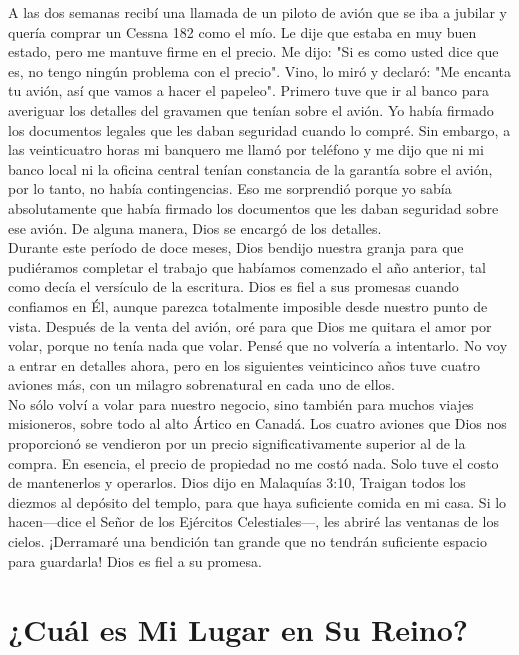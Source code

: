 \documentclass[twoside, 12pt]{book}
\begin{document}
A las dos semanas recibí una llamada de un piloto de avión que se iba a jubilar y quería comprar un Cessna 182 como el mío. Le dije que estaba en muy buen estado, pero me mantuve firme en el precio. Me dijo: "Si es como usted dice que es, no tengo ningún problema con el precio". Vino, lo miró y declaró: "Me encanta tu avión, así que vamos a hacer el papeleo". Primero tuve que ir al banco para averiguar los detalles del gravamen que tenían sobre el avión. Yo había firmado los documentos legales que les daban seguridad cuando lo compré. Sin embargo, a las veinticuatro horas mi banquero me llamó por teléfono y me dijo que ni mi banco local ni la oficina central tenían constancia de la garantía sobre el avión, por lo tanto, no había contingencias. Eso me sorprendió porque yo sabía absolutamente que había firmado los documentos que les daban seguridad sobre ese avión. De alguna manera, Dios se encargó de los detalles.\\

Durante este período de doce meses, Dios bendijo nuestra granja para que pudiéramos completar el trabajo que habíamos comenzado el año anterior, tal como decía el versículo de la escritura. Dios es fiel a sus promesas cuando confiamos en Él, aunque parezca totalmente imposible desde nuestro punto de vista. Después de la venta del avión, oré para que Dios me quitara el amor por volar, porque no tenía nada que volar. Pensé que no volvería a intentarlo. No voy a entrar en detalles ahora, pero en los siguientes veinticinco años tuve cuatro aviones más, con un milagro sobrenatural en cada uno de ellos.\\

No sólo volví a volar para nuestro negocio, sino también para muchos viajes misioneros, sobre todo al alto Ártico en Canadá. Los cuatro aviones que Dios nos proporcionó se vendieron por un precio significativamente superior al de la compra. En esencia, el precio de propiedad no me costó nada. Solo tuve el costo de mantenerlos y operarlos. Dios dijo en Malaquías 3:10, Traigan todos los diezmos al depósito del templo, para que haya suficiente comida en mi casa. Si lo hacen—dice el Señor de los Ejércitos Celestiales—, les abriré las ventanas de los cielos. ¡Derramaré una bendición tan grande que no tendrán suficiente espacio para guardarla! Dios es fiel a su promesa.\\



\chapter{¿Cuál es Mi Lugar en Su Reino?}
\
\end{document}
